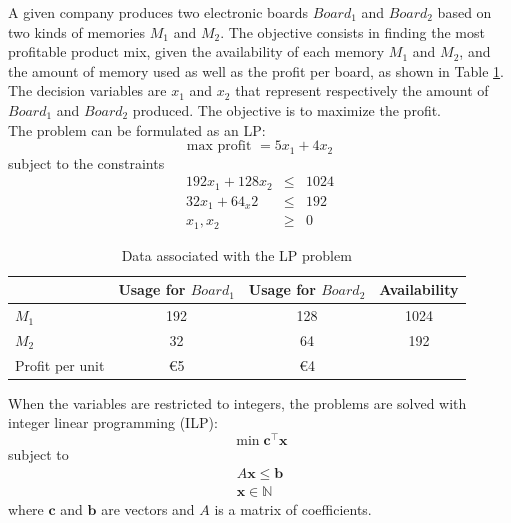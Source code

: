 \begin{example}
A given company produces two electronic boards $Board_1$ and $Board_2$ based on two kinds of memories $M_1$ and $M_2$. The objective consists in finding the most profitable product mix, given the availability of each memory $M_1$ and $M_2$, and the amount of memory used as well as the profit per board, as shown in Table \ref{tab:ex_lp}. The decision variables are $x_1$ and $x_2$ that represent respectively the amount of $Board_1$ and $Board_2$ produced. The objective is to maximize the profit.\\
The problem can be formulated as an LP:
\begin{equation}
\text{max profit } = 5x_1 + 4x_2
\end{equation}
subject to the constraints
\begin{eqnarray*}
192x_1 + 128 x_2 &\leq& 1024\\
32x_1 + 64_x2 &\leq& 192\\
x_1, x_2 &\geq& 0
\end{eqnarray*}
\end{example}

\begin{table}[h!]
\begin{center}
\caption{Data associated with the LP problem}
\begin{tabular}{|l|c|c|c|}
\hline
& Usage for $Board_1$ & Usage for $Board_2$ & Availability\\
\hline
$M_1$ & 192 & 128 & 1024 \\
$M_2$ & 32 & 64 & 192 \\
Profit per unit & \euro 5 & \euro 4 & \\
\hline
\end{tabular}
\label{tab:ex_lp}
\end{center}
\end{table}

When the variables are restricted to integers, the problems are solved with integer linear programming (ILP):
\begin{equation}
\min \mathbf{c}^\intercal\mathbf{x}
\end{equation}
subject to
\begin{equation*}
\begin{gathered}
A\mathbf{x} \leq \mathbf{b}\\
\mathbf{x} \in \mathbb{N}
\end{gathered}
\end{equation*}
where $\mathbf{c}$ and $\mathbf{b}$ are vectors and $A$ is a matrix of coefficients.

